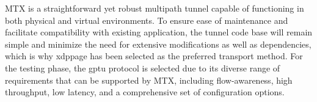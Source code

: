 MTX is a straightforward yet robust multipath tunnel capable of functioning in both physical and virtual environments. 
To ensure ease of maintenance and facilitate compatibility with existing application, the tunnel code base will remain simple and minimize the need for extensive modifications as well as dependencies, which is why \ac{xdppage} has been selected as the preferred transport method.
For the testing phase, the \ac{gptu} protocol is selected due to its diverse range of requirements that can be supported by MTX, including flow-awareness, high throughput, low latency, and a comprehensive set of configuration options.
